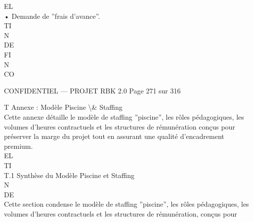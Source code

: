 \vspace{0.5em}
\vspace{0.5em}
\vspace{0.5em}
EL\\
• Demande de ”frais d’avance”.\\
\vspace{0.5em}
\vspace{0.5em}
\vspace{0.5em}
\vspace{0.5em}
TI\\
N\\
DE\\
FI\\
N\\
CO\\
\vspace{0.5em}
\vspace{0.5em}
\vspace{0.5em}
\vspace{0.5em}
\begin{confidential}CONFIDENTIEL — PROJET RBK 2.0                                    Page 271 sur 316\end{confidential}
T \textbar{} Annexe : Modèle Piscine \textbackslash{}& Staffing\\
\vspace{0.5em}
\vspace{0.5em}
Cette annexe détaille le modèle de staffing ”piscine”, les rôles pédagogiques, les volumes d’heures contractuels et les structures de rémunération conçus pour\\
préserver la marge du projet tout en assurant une qualité d’encadrement premium.\\
\vspace{0.5em}
\vspace{0.5em}
\vspace{0.5em}
\vspace{0.5em}
EL\\
TI\\
T.1 Synthèse du Modèle Piscine et Staffing\\
\vspace{0.5em}
\vspace{0.5em}
\vspace{0.5em}
\vspace{0.5em}
N\\
DE\\
Cette section condense le modèle de staffing ”piscine”, les rôles pédagogiques, les volumes d’heures contractuels et les structures de rémunération, conçus pour\\
